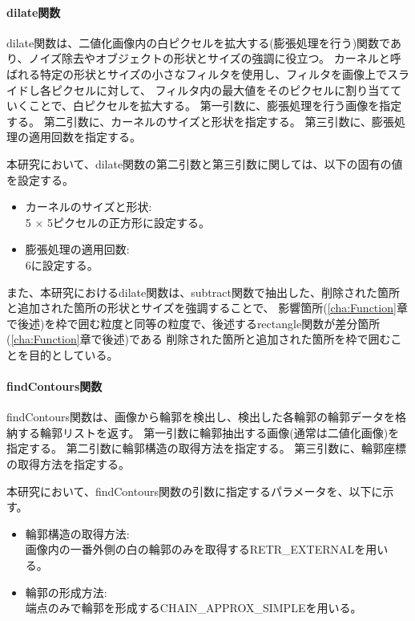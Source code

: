 \paragraph{dilate関数}
dilate関数は、二値化画像内の白ピクセルを拡大する(膨張処理を行う)関数であり、ノイズ除去やオブジェクトの形状とサイズの強調に役立つ。
カーネルと呼ばれる特定の形状とサイズの小さなフィルタを使用し、フィルタを画像上でスライドし各ピクセルに対して、
フィルタ内の最大値をそのピクセルに割り当てていくことで、白ピクセルを拡大する。
第一引数に、膨張処理を行う画像を指定する。
第二引数に、カーネルのサイズと形状を指定する。
第三引数に、膨張処理の適用回数を指定する。
\par
本研究において、dilate関数の第二引数と第三引数に関しては、以下の固有の値を設定する。
\begin{itemize}
      \setlength{\itemsep}{0pt}
            \setlength{\parsep}{0pt}
      \item カーネルのサイズと形状:\\
            5 $\times$ 5ピクセルの正方形に設定する。
      \item 膨張処理の適用回数:\\
            $6$に設定する。
\end{itemize}
\par
また、本研究におけるdilate関数は、subtract関数で抽出した、削除された箇所と追加された箇所の形状とサイズを強調することで、
影響箇所(\ref{cha:Function}章で後述)を枠で囲む粒度と同等の粒度で、後述するrectangle関数が差分箇所(\ref{cha:Function}章で後述)である
削除された箇所と追加された箇所を枠で囲むことを目的としている。
\paragraph{findContours関数}
findContours関数は、画像から輪郭を検出し、検出した各輪郭の輪郭データを格納する輪郭リストを返す。
第一引数に輪郭抽出する画像(通常は二値化画像)を指定する。
第二引数に輪郭構造の取得方法を指定する。
第三引数に、輪郭座標の取得方法を指定する。
\par
本研究において、findContours関数の引数に指定するパラメータを、以下に示す。
\begin{itemize}
      \setlength{\itemsep}{0pt}
            \setlength{\parsep}{0pt}
      \item 輪郭構造の取得方法:\\
            画像内の一番外側の白の輪郭のみを取得するRETR\_EXTERNALを用いる。
      \item 輪郭の形成方法:\\
            端点のみで輪郭を形成するCHAIN\_APPROX\_SIMPLEを用いる。
\end{itemize}
\par
